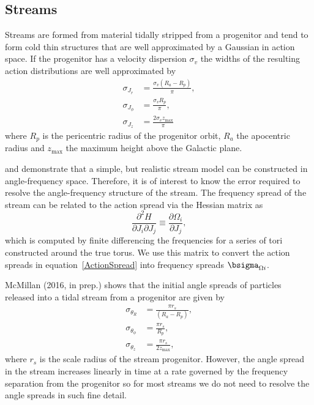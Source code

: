 \documentclass[useAMS,usenatbib,fleqn,a4paper]{mn2e}
\begin{document}
\subsection{Streams}

Streams are formed from material tidally stripped from a progenitor and tend
to form cold thin structures that are well approximated by a Gaussian in
action space. If the progenitor has a velocity dispersion $\sigma_v$ the
widths of the resulting action distributions are well approximated by
\citep{EyreBinney2011}
\begin{equation}
\begin{split}
\sigma_{J_r} &= \frac{\sigma_v(R_a-R_p)}{\pi},\\
\sigma_{J_\phi} &= \frac{\sigma_v R_p}{\pi},\\
\sigma_{J_z} &= \frac{2\sigma_v z_\mathrm{max}}{\pi}
\end{split}
\label{ActionSpread}
\end{equation}
where $R_p$ is the pericentric radius of the progenitor orbit, $R_a$ the
apocentric radius and $z_\mathrm{max}$ the maximum height above the Galactic
plane.

\cite{Bovy2014} and \cite{Sanders2014} demonstrate that a simple, but
realistic stream model can be constructed in angle-frequency space.
Therefore, it is of interest to know the error required to resolve the
angle-frequency structure of the stream. The frequency spread of the stream
can be related to the action spread via the Hessian matrix as
\begin{equation}
\frac{\partial^2 H}{\partial J_i \partial J_j}\equiv \frac{\partial \Omega_i}{\partial J_j},
\end{equation}
which is computed by finite differencing the frequencies for a series of tori
constructed around the true torus. We use this matrix to convert the action
spreads in equation~\eqref{ActionSpread} into frequency spreads
$\bsigma_{\Omega i}$.

McMillan (2016, in prep.) shows that the initial angle spreads of
particles released into a tidal stream from a progenitor are given by
\begin{equation}
\begin{split}
\sigma_{\theta_R} &= \frac{\pi r_s}{(R_a-R_p)},\\
\sigma_{\theta_\phi} &= \frac{\pi r_s}{R_p},\\
\sigma_{\theta_z} &= \frac{\pi r_s}{2 z_\mathrm{max}},
\end{split}
\end{equation}
where $r_s$ is the scale radius of the stream progenitor. However, the angle
spread in the stream increases linearly in time at a rate governed by the
frequency separation from the progenitor so for most streams we do not need
to resolve the angle spreads in such fine detail.

\label{lastpage}
\end{document}
